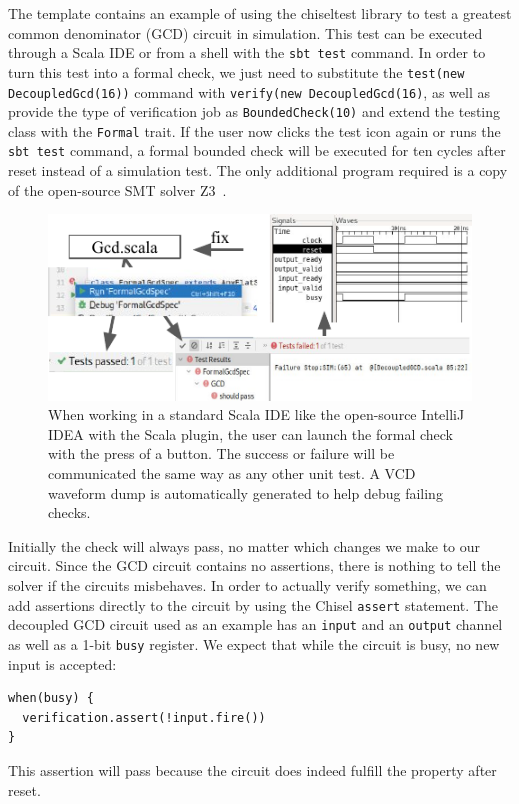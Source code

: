 \documentclass[conference]{IEEEtran}
\newcommand{\code}[1]{{\small{\texttt{#1}}}}
\begin{document}
The template contains an example of using the chiseltest library to test a greatest common denominator (GCD) circuit in simulation.
This test can be executed through a Scala IDE or from a shell with the \code{sbt test} command.
In order to turn this test into a formal check, we just need to substitute the \code{test(new DecoupledGcd(16))}
command with \code{verify(new DecoupledGcd(16)}, as well as provide the type of verification job as
\code{BoundedCheck(10)} and extend the testing class with the \code{Formal} trait.
If the user now clicks the test icon again or runs the \code{sbt test} command, a formal bounded check will
be executed for ten cycles after reset instead of a simulation test.
The only additional program required is a copy of the open-source SMT solver Z3~\cite{de2008z3}.

\begin{figure}[h]
\centering
\includegraphics{woset_formal_ide_flow.pdf}
\caption{When working in a standard Scala IDE like the open-source IntelliJ IDEA with the Scala plugin, the user can launch the formal check with the press of a button.
The success or failure will be communicated the same way as any other unit test. A VCD waveform dump is automatically generated to help debug failing checks.}
\label{fig:ide-flow}
\end{figure}

Initially the check will always pass, no matter which changes we make to our circuit.
Since the GCD circuit contains no assertions, there is nothing to tell the solver if the circuits misbehaves.
In order to actually verify something, we can add assertions directly to the circuit by using the
Chisel \code{assert} statement.
The decoupled GCD circuit used as an example has an \code{input} and an \code{output} channel
as well as a 1-bit \code{busy} register.
We expect that while the circuit is busy, no new input is accepted:
\begin{verbatim}
when(busy) {
  verification.assert(!input.fire())
}
\end{verbatim}
This assertion will pass because the circuit does indeed fulfill the property after reset.
\end{document}
